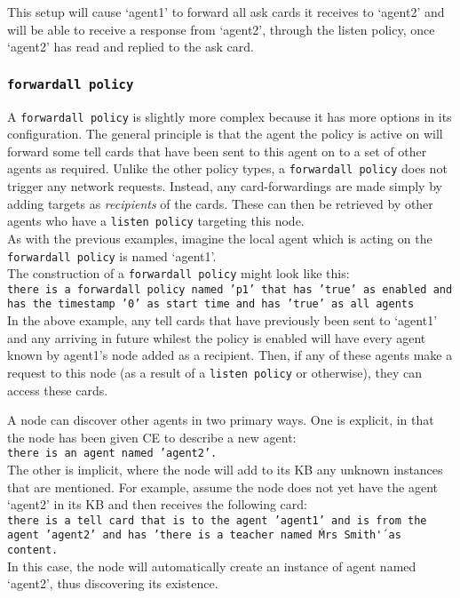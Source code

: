 \documentclass{scrartcl}
\begin{document}
This setup will cause `agent1' to forward all ask cards it receives to `agent2' and will be able to receive a response from `agent2', through the listen policy, once `agent2' has read and replied to the ask card.

\subsubsection{\texttt{forwardall policy}}
A \texttt{forwardall policy} is slightly more complex because it has more options in its configuration. The general principle is that the agent the policy is active on will forward some tell cards that have been sent to this agent on to a set of other agents as required. Unlike the other policy types, a \texttt{forwardall policy} does not trigger any network requests. Instead, any card-forwardings are made simply by adding targets as \textit{recipients} of the cards. These can then be retrieved by other agents who have a \texttt{listen policy} targeting this node.\\

As with the previous examples, imagine the local agent which is acting on the \texttt{forwardall policy} is named `agent1'.\\

The construction of a \texttt{forwardall policy} might look like this:\\
\texttt{there is a forwardall policy named 'p1' that has 'true' as enabled and has the timestamp '0' as start time and has 'true' as all agents}\\

In the above example, any tell cards that have previously been sent to `agent1' and any arriving in future whilest the policy is enabled will have every agent known by agent1's node added as a recipient. Then, if any of these agents make a request to this node (as a result of a \texttt{listen policy} or otherwise), they can access these cards.

A node can discover other agents in two primary ways. One is explicit, in that the node has been given CE to describe a new agent:\\
\texttt{there is an agent named 'agent2'.}\\
The other is implicit, where the node will add to its KB any unknown instances that are mentioned. For example, assume the node does not yet have the agent `agent2' in its KB and then receives the following card:\\
\texttt{there is a tell card that is to the agent 'agent1' and is from the agent 'agent2' and has 'there is a teacher named \'Mrs Smith\'' as content.}\\
In this case, the node will automatically create an instance of agent named `agent2', thus discovering its existence.
\end{document}
